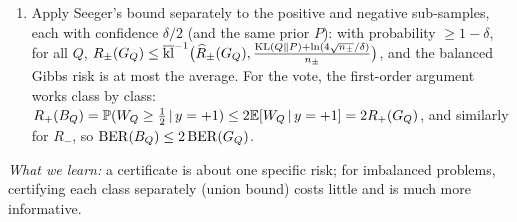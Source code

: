 \documentclass[11pt]{article}
\begin{document}
\begin{solution}
\begin{enumerate}
      The choice $\lambda=4t/\sum_ic_i^2$ gives $\exp(-2t^2/\sum_ic_i^2)$, and $\sum_ic_i^2=\frac{n_+}{4n_+^2}+\frac{n_-}{4n_-^2}=\frac14\big(\frac1{n_+}+\frac1{n_-}\big)$.
      Setting the probability to $\delta$ gives $t=\sqrt{\frac{\ln(1/\delta)}8\big(\frac1{n_+}+\frac1{n_-}\big)}$. Numerically,
      $t=\sqrt{\frac{2.996}8\times0.0111}=0.0645$ and the bound is $0.07+0.0645=0.135$, slightly worse than $0.131$: it avoids the
      union bound but uses Hoeffding instead of kl, which is costly for the small risk of the negative class.
\item Apply Seeger's bound separately to the positive and negative sub-samples, each with confidence $\delta/2$
      (and the same prior $P$): with probability $\geq1-\delta$, for all $Q$,
      $R_\pm(G_{Q})\leq\overline{\operatorname{kl}}^{-1}\big(\widehat R_\pm(G_{Q}),\frac{\operatorname{KL}(Q\|P)+\ln(4\sqrt{n_\pm}/\delta)}{n_\pm}\big)$, and the balanced Gibbs risk is at
      most the average. For the vote, the first-order argument works class by class:
      $R_+(B_{Q})=\mathbb{P}(W_Q\geq\frac12\,|\,y=+1)\leq2\mathbb{E}[W_Q\,|\,y=+1]=2R_+(G_{Q})$, and similarly for $R_-$, so
      $\mathrm{BER}(B_{Q})\leq2\,\mathrm{BER}(G_{Q})$.
\end{enumerate}
\emph{What we learn:} a certificate is about one specific risk; for imbalanced problems, certifying each class
separately (union bound) costs little and is much more informative.
\end{solution}
\end{document}
